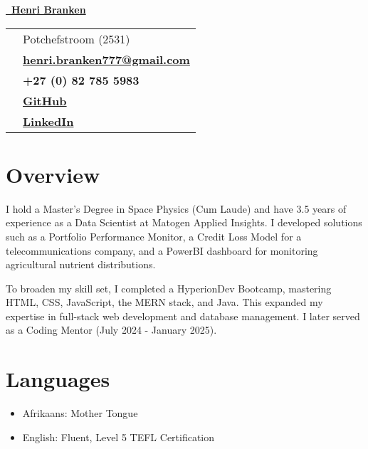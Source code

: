 \documentclass[a4paper,10pt]{article}
\begin{document}
	\begin{center}
		{\LARGE\textbf{\href{https://henribranken.github.io/MyCV/}{\faHandPointer~Henri Branken}}} \\[0.5cm]
		
		\begin{tabularx}{0.7\textwidth}{c X}
			\faHome & Potchefstroom (2531) \\
			\faEnvelope & \href{mailto:henri.branken777@gmail.com}{\textbf{henri.branken777@gmail.com}} \\
			\faPhone & \textbf{+27 (0) 82 785 5983} \\
			\faGithub & \href{https://github.com/HenriBranken}{\textbf{GitHub}} \\
			\faLinkedin & \href{https://www.linkedin.com/in/henri-branken-1423a2153/}{\textbf{LinkedIn}}
		\end{tabularx}
	\end{center}
	
	\begin{minipage}{0.3\textwidth}
	\end{minipage}
	
	\section*{Overview}
	I hold a Master's Degree in Space Physics (Cum Laude) and have 3.5 years of experience as a Data Scientist at Matogen Applied Insights. I developed solutions such as a Portfolio Performance Monitor, a Credit Loss Model for a telecommunications company, and a PowerBI dashboard for monitoring agricultural nutrient distributions.
	
	To broaden my skill set, I completed a HyperionDev Bootcamp, mastering HTML, CSS, JavaScript, the MERN stack, and Java. This expanded my expertise in full-stack web development and database management. I later served as a Coding Mentor (July 2024 - January 2025).
	
	\section*{Languages}
	\begin{itemize}
		\item Afrikaans: Mother Tongue
		\item English: Fluent, Level 5 TEFL Certification
	\end{itemize}
	
\end{document}
